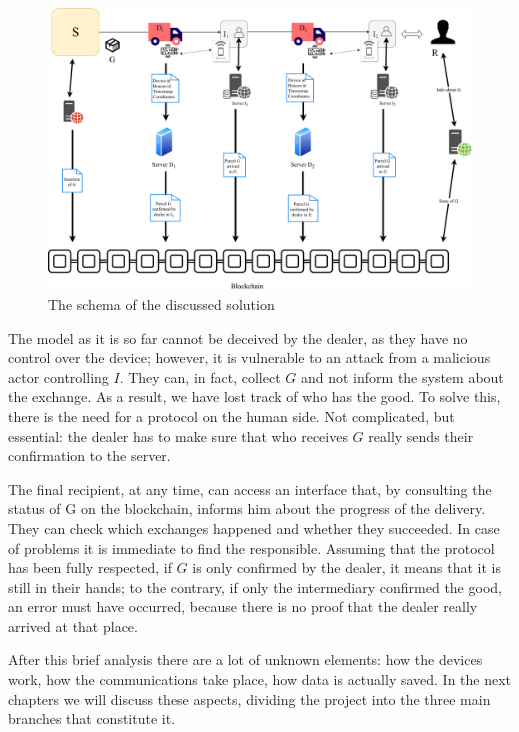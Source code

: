 \begin{figure}[h]
    \centering
    \includegraphics[width=\textwidth]{figures/solutionSansSerif.pdf}
    \caption{The schema of the discussed solution}
    \label{fig:solution}
\end{figure}

The model as it is so far cannot be deceived by the dealer, as they have no control over the device; however, it is vulnerable to an attack from a malicious actor controlling $I$. They can, in fact, collect $G$ and not inform the system about the exchange. As a result, we have lost track of who has the good. To solve this, there is the need for a protocol on the human side. Not complicated, but essential: the dealer has to make sure that who receives $G$ really sends their confirmation to the server. 

The final recipient, at any time, can access an interface that, by consulting the status of G on the blockchain, informs him about the progress of the delivery. They can check which exchanges happened and whether they succeeded. In case of problems it is immediate to find the responsible. Assuming that the protocol has been fully respected, if $G$ is only confirmed by the dealer, it means that it is still in their hands; to the contrary, if only the intermediary confirmed the good, an error must have occurred, because there is no proof that the dealer really arrived at that place.

After this brief analysis there are a lot of unknown elements: how the devices work, how the communications take place, how data is actually saved. In the next chapters we will discuss these aspects, dividing the project into the three main branches that constitute it.


